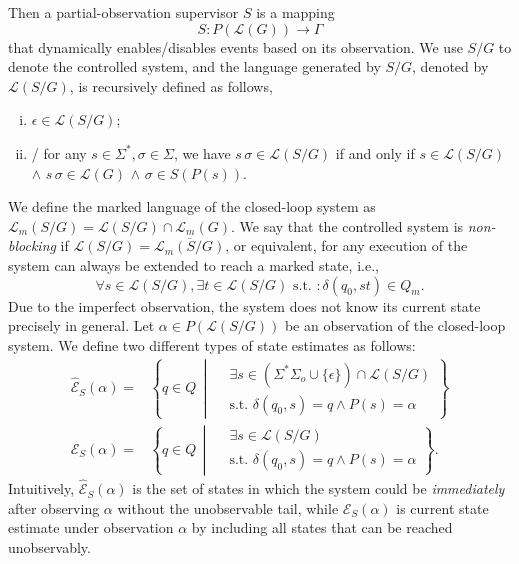 \documentclass[twocolumn]{autart}
\def \L{\mathcal{L}}
\begin{document}
 
 


Then a partial-observation supervisor $S$ is a mapping 
\[
S : P(\mathcal{L}(G)) \to  \Gamma
\]
that dynamically enables/disables events based on its observation. 
We use $S / G$ to denote the controlled system, and the language generated by $S /G$, denoted by $\mathcal{L}(S / G)$, is recursively defined as follows,
\begin{enumerate}[(i)]
    \item $\epsilon \in \mathcal{L}(S / G)$;
    \item /
    for any $s\in\Sigma^*,\sigma\in\Sigma$, we have
    $s \, \sigma \in \mathcal{L}(S / G)$ if and only if
    $s \in \mathcal{L}(S / G)$ $\wedge$ $s \, \sigma \in \mathcal{L}(G)$ $\wedge$ $\sigma \in S(P(s))$.
\end{enumerate}
We define the marked language of the closed-loop system  as $\mathcal{L}_m(S / G) = \mathcal{L}(S / G) \cap \mathcal{L}_m(G)$. 
We say that the controlled system is \emph{non-blocking} if 
$\L(S/G)=\overline{\L_m(S/G)}$, or equivalent, 
for any execution of the system can always be extended to reach a marked state, i.e., 
\begin{equation}
    \forall s\in \L(S/G),\exists t\in \L(S/G) \text{ s.t. } : \delta(q_0,st)\in Q_m.
\end{equation}
Due to the imperfect observation, the system does not know its current state precisely in general. 
Let $\alpha \in P(\L(S/G))$ be an observation of the closed-loop system. 
We define two different types of state estimates as follows:
\begin{align}
\hat{\mathcal{E}}_S(\alpha) 
= &\left\{ q\in Q \,\middle\vert\,
\begin{array}{cc}
     &  \exists s\in  (\Sigma^*\Sigma_o \cup\{\epsilon\}) \cap \mathcal{L}(S / G) \\
     & \text{s.t. }\delta(q_0, s) = q \wedge P(s) = \alpha
\end{array}
\right\}  \label{eq:immed_esti}\\ 
{\mathcal{E}}_S(\alpha) 
= &\left\{ q\in Q \,\middle\vert\,
\begin{array}{cc}
     &  \exists s\in \mathcal{L}(S / G) \\
     & \text{s.t. }\delta(q_0, s) = q \wedge P(s) = \alpha
\end{array}
\right\}. \label{eq:esti}
\end{align}
Intuitively, 
$\hat{\mathcal{E}}_S(\alpha) $ is the set of states in which the system could be \emph{immediately} after observing $\alpha$ without the unobservable tail, 
while 
${\mathcal{E}}_S(\alpha) $ is current state estimate under observation $\alpha$ by including all states that can be reached unobservably. 
 
\end{document}
